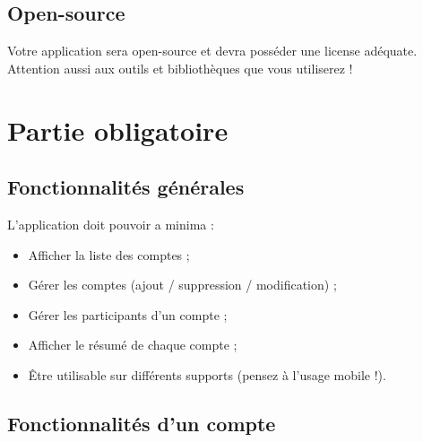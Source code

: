\documentclass{42-fr}
\begin{document}

	\section{Open-source}
		Votre application sera open-source et devra poss\'eder une license ad\'equate.
		Attention aussi aux outils et biblioth\`eques que vous utiliserez !



\chapter{Partie obligatoire}


    \section{Fonctionnalit\'es g\'en\'erales}

        L'application doit pouvoir a minima :\\

        \begin{itemize}\itemsep1pt
            \item Afficher la liste des comptes ;
			\item G\'erer les comptes (ajout / suppression / modification) ;
            \item G\'erer les participants d'un compte ;
			\item Afficher le r\'esum\'e de chaque compte ;
			\item \^Etre utilisable sur diff\'erents supports (pensez \`a l'usage mobile !).
        \end{itemize}


    \section{Fonctionnalit\'es d'un compte}
\end{document}
